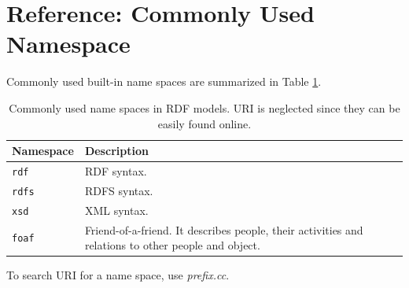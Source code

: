 \section{Reference: Commonly Used Namespace}

Commonly used built-in name spaces are summarized in Table \ref{tab:commonnamespace}.

\begin{table}
	\centering \caption{Commonly used name spaces in RDF models. URI is neglected since they can be easily found online.} \label{tab:commonnamespace}
	\begin{tabularx}{\textwidth}{lX}
		\hline
		Namespace & Description \\ \hline
		\verb|rdf| & RDF syntax. \\
		\verb|rdfs| & RDFS syntax. \\
		\verb|xsd|  & XML syntax. \\
		\verb|foaf| & Friend-of-a-friend. It describes people, their activities and relations to other people and object. \\
		\hline
	\end{tabularx}
\end{table}

To search URI for a name space, use \textit{prefix.cc}.





























